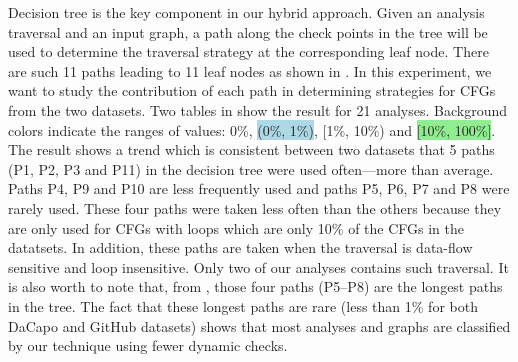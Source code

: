 Decision tree is the key component in our hybrid approach. Given an analysis 
traversal and an input graph, a path along the check points in the tree will 
be used to determine the traversal strategy at the corresponding leaf node. 
There are such 11 paths leading to 11 leaf nodes as shown in . 
%
In this experiment, we want to study the contribution of each path in 
determining strategies for CFGs from the two datasets. Two tables in 
 show the result for 21 analyses. Background colors indicate the ranges of values: \colorbox{lightred}{0\%}, 
\colorbox{lightblue}{(0\%, 1\%)}, \colorbox{lightblack}{[1\%, 10\%)} and \colorbox{lightgreen}{[10\%, 100\%]}.
%
The result shows a trend which is consistent between two datasets that 5 
paths (P1, P2, P3 and P11) in the decision tree were used often---more 
than average. Paths P4, P9 and P10 are less frequently used and paths P5, P6, 
P7 and P8 were rarely used. 
These four paths were taken less often than the others because they are only 
used for CFGs with loops which are only 10\% of the CFGs in the datatsets.
In addition, these paths are taken when the traversal is data-flow sensitive 
and loop insensitive. Only two of our analyses contains such traversal.
%
It is also worth to note that, from , those four paths 
(P5--P8) are the longest paths in the tree. The fact that these longest paths 
are rare (less than 1\% for both DaCapo and GitHub datasets) shows that 
most analyses and graphs are classified by our technique using fewer dynamic 
checks.

